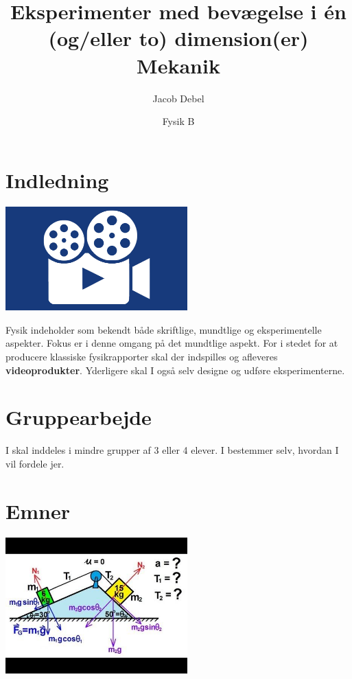 \documentclass[a4paper, 12pt]{article}
\author{Jacob Debel}
\date{Fysik B}
\title{Eksperimenter med bevægelse i én (og/eller to) dimension(er)\\\medskip
\large Mekanik}
\begin{document}
\maketitle


\section*{Indledning}
\label{sec:org72befda}
\begin{center}
\includegraphics[width=7cm]{img/2019-12-10_07-58-00_film-and-vid.jpg}
\end{center}

Fysik indeholder som bekendt både skriftlige, mundtlige og eksperimentelle aspekter. 
Fokus er i denne omgang på det mundtlige aspekt. For i stedet for at producere klassiske fysikrapporter skal der indspilles og afleveres \textbf{videoprodukter}. Yderligere skal I også selv designe og udføre eksperimenterne.

\section*{Gruppearbejde}
\label{sec:orga8f1ac8}
I skal inddeles i mindre grupper af 3 eller 4 elever. I bestemmer selv, hvordan I vil fordele jer.

\section*{Emner}
\label{sec:org3dc9a1a}
\begin{center}
\includegraphics[width=7cm]{img/2019-12-10_07-41-43_34817502643b8a0b0805dd422c8a8283.jpg}
\end{center}
\end{document}

